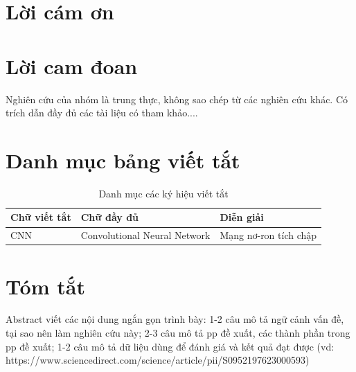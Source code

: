 ﻿\chapter*{Lời cám ơn}

\chapter*{Lời cam đoan}
Nghiên cứu của nhóm là trung thực, không sao chép từ các nghiên cứu khác. Có trích dẫn đầy đủ các tài liệu có tham khảo....

\chapter*{Danh mục bảng viết tắt}
\begin{table}[ht!]
\centering
\caption{Danh mục các ký hiệu viết tắt}\label{tab:data}
\begin{tabular}{|l|l|l|}
\hline
\large \textbf{Chữ viết tắt} & \large \textbf{Chữ đầy đủ }&  \large \textbf{Diễn giải} \\ \hline
CNN & Convolutional Neural Network & Mạng nơ-ron tích chập  \\ \hline
\end{tabular}
\end{table}


\chapter*{Tóm tắt}
Abstract viết các nội dung ngắn gọn trình bày: 1-2 câu mô tả ngữ cảnh vấn đề, tại sao nên làm nghiên cứu này; 2-3 câu mô tả pp đề xuất, các thành phần trong pp đề xuất; 1-2 câu mô tả dữ liệu dùng để đánh giá và kết quả đạt được (vd: https://www.sciencedirect.com/science/article/pii/S0952197623000593)



